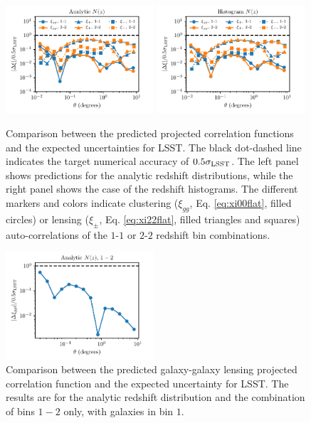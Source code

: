 \documentclass[\docopts]{\docclass}
\begin{document}
\begin{figure}
\centering
\includegraphics[width=0.49\textwidth]{projected_correlation_error_comparison_analytic} 
\includegraphics[width=0.49\textwidth]{projected_correlation_error_comparison_histo} 
\caption{Comparison between the predicted projected correlation functions and the expected uncertainties for LSST. The black dot-dashed line indicates the target numerical accuracy of $0.5\sigma_{\rm LSST}$. The left panel shows predictions for the analytic redshift distributions, while the right panel shows the case of the redshift histograms. The different markers and colors indicate clustering ($\xi_{gg}$, Eq. \ref{eq:xi00flat}, filled circles) or lensing ($\xi_{\pm}$, Eq. \ref{eq:xi22flat}, filled triangles and squares) auto-correlations of the $1$-$1$ or $2$-$2$ redshift bin combinations.}
\label{fig:corrval}
\end{figure}
\begin{figure}
\centering
\includegraphics[width=0.49\textwidth]{projected_xiggl_error_comparison_analytic}
\caption{Comparison between the predicted galaxy-galaxy lensing projected correlation function and the expected uncertainty for LSST. The results are for the analytic redshift distribution and the combination of bins $1-2$ only, with galaxies in bin $1$.}
\label{fig:corrval2}
\end{figure}
\end{document}
